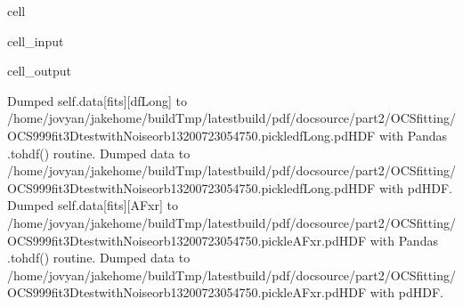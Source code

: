 \documentclass[letterpaper,table,10pt,english]{jupyterBook}
\begin{document}
\begin{sphinxuseclass}{cell}\begin{sphinxVerbatimInput}

\begin{sphinxuseclass}{cell_input}
\begin{sphinxVerbatim}[commandchars=\\\{\}]

      
\end{sphinxVerbatim}

\end{sphinxuseclass}\end{sphinxVerbatimInput}
\begin{sphinxVerbatimOutput}

\begin{sphinxuseclass}{cell_output}
\begin{sphinxVerbatim}[commandchars=\\\{\}]
Dumped self.data[fits][dfLong] to /home/jovyan/jake\PYGZhy{}home/buildTmp/\PYGZus{}latest\PYGZus{}build/pdf/doc\PYGZhy{}source/part2/OCSfitting/OCS\PYGZus{}999\PYGZus{}fit\PYGZus{}3D\PYGZhy{}test\PYGZus{}withNoise\PYGZus{}orb13\PYGZus{}200723\PYGZus{}05\PYGZhy{}47\PYGZhy{}50.pickle\PYGZus{}dfLong.pdHDF with Pandas .to\PYGZus{}hdf() routine.
Dumped data to /home/jovyan/jake\PYGZhy{}home/buildTmp/\PYGZus{}latest\PYGZus{}build/pdf/doc\PYGZhy{}source/part2/OCSfitting/OCS\PYGZus{}999\PYGZus{}fit\PYGZus{}3D\PYGZhy{}test\PYGZus{}withNoise\PYGZus{}orb13\PYGZus{}200723\PYGZus{}05\PYGZhy{}47\PYGZhy{}50.pickle\PYGZus{}dfLong.pdHDF with pdHDF.
Dumped self.data[fits][AFxr] to /home/jovyan/jake\PYGZhy{}home/buildTmp/\PYGZus{}latest\PYGZus{}build/pdf/doc\PYGZhy{}source/part2/OCSfitting/OCS\PYGZus{}999\PYGZus{}fit\PYGZus{}3D\PYGZhy{}test\PYGZus{}withNoise\PYGZus{}orb13\PYGZus{}200723\PYGZus{}05\PYGZhy{}47\PYGZhy{}50.pickle\PYGZus{}AFxr.pdHDF with Pandas .to\PYGZus{}hdf() routine.
Dumped data to /home/jovyan/jake\PYGZhy{}home/buildTmp/\PYGZus{}latest\PYGZus{}build/pdf/doc\PYGZhy{}source/part2/OCSfitting/OCS\PYGZus{}999\PYGZus{}fit\PYGZus{}3D\PYGZhy{}test\PYGZus{}withNoise\PYGZus{}orb13\PYGZus{}200723\PYGZus{}05\PYGZhy{}47\PYGZhy{}50.pickle\PYGZus{}AFxr.pdHDF with pdHDF.
\end{sphinxVerbatim}

\end{sphinxuseclass}\end{sphinxVerbatimOutput}

\end{sphinxuseclass}
\end{document}
